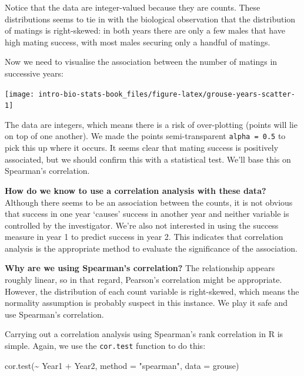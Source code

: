 \documentclass[
]{book}
\newenvironment{Shaded}{\begin{snugshade}}{\end{snugshade}}
\newcommand{\AttributeTok}[1]{\textcolor[rgb]{0.77,0.63,0.00}{#1}}
\newcommand{\FunctionTok}[1]{\textcolor[rgb]{0.00,0.00,0.00}{#1}}
\newcommand{\NormalTok}[1]{#1}
\newcommand{\SpecialCharTok}[1]{\textcolor[rgb]{0.00,0.00,0.00}{#1}}
\newcommand{\StringTok}[1]{\textcolor[rgb]{0.31,0.60,0.02}{#1}}
\begin{document}
Notice that the data are integer-valued because they are counts. These distributions seems to tie in with the biological observation that the distribution of matings is right-skewed: in both years there are only a few males that have high mating success, with most males securing only a handful of matings.

Now we need to visualise the association between the number of matings in successive years:

\begin{center}\texttt{[image: intro-bio-stats-book\_files/figure-latex/grouse-years-scatter-1]} \end{center}

The data are integers, which means there is a risk of over-plotting (points will lie on top of one another). We made the points semi-transparent \texttt{alpha\ =\ 0.5} to pick this up where it occurs. It seems clear that mating success is positively associated, but we should confirm this with a statistical test. We'll base this on Spearman's correlation.

\textbf{How do we know to use a correlation analysis with these data?} Although there seems to be an association between the counts, it is not obvious that success in one year `causes' success in another year and neither variable is controlled by the investigator. We're also not interested in using the success measure in year 1 to predict success in year 2. This indicates that correlation analysis is the appropriate method to evaluate the significance of the association.

\textbf{Why are we using Spearman's correlation?} The relationship appears roughly linear, so in that regard, Pearson's correlation might be appropriate. However, the distribution of each count variable is right-skewed, which means the normality assumption is probably suspect in this instance. We play it safe and use Spearman's correlation.

Carrying out a correlation analysis using Spearman's rank correlation in R is simple. Again, we use the \texttt{cor.test} function to do this:

\begin{Shaded}
\begin{Highlighting}[]
\FunctionTok{cor.test}\NormalTok{(}\SpecialCharTok{\textasciitilde{}}\NormalTok{ Year1 }\SpecialCharTok{+}\NormalTok{ Year2, }\AttributeTok{method =} \StringTok{"spearman"}\NormalTok{, }\AttributeTok{data =}\NormalTok{ grouse)}
\end{Highlighting}
\end{Shaded}
\end{document}

